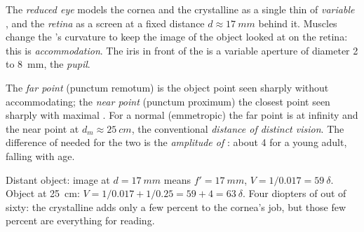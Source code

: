 \begin{definition}\label{def:b1:optical-instruments:eye}
The \emph{reduced eye} models the cornea and the crystalline  as a
single thin  of \emph{variable} , and the
\emph{retina} as a screen at a fixed distance $d \approx \qty{17}{mm}$
behind it. Muscles change the 's curvature to keep the image of the
object looked at on the retina: this is \emph{accommodation}. The iris
in front of the  is a variable aperture of diameter \qty{2}{} to
\qty{8}{mm}, the \emph{pupil}.
\end{definition}

\begin{definition}\label{def:b1:optical-instruments:punctum}
The \emph{far point} (punctum remotum) is the object point seen
sharply without accommodating; the \emph{near point} (punctum proximum)
the closest point seen sharply with maximal . For a normal
(emmetropic)  the far point is at infinity and the near point at
$d_m \approx \qty{25}{cm}$, the conventional \emph{distance of distinct
vision}. The difference of  needed for the two is the
\emph{amplitude of }: about \qty{4}{\delta} for a young
adult, falling with age.
\end{definition}

\begin{example}\label{ex:b1:optical-instruments:vergence}
Distant object: image at $d = \qty{17}{mm}$ means $f' = \qty{17}{mm}$,
$V = 1/0.017 = \qty{59}{\delta}$. Object at \qty{25}{cm}:
$V = 1/0.017 + 1/0.25 = 59 + 4 = \qty{63}{\delta}$. Four diopters of
 out of sixty: the crystalline  adds only a few percent
to the cornea's job, but those few percent are everything for reading.
\end{example}

